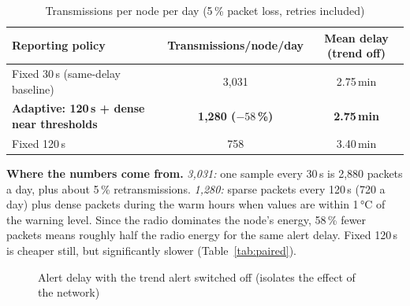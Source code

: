 \documentclass[11pt,a4paper]{report}
\newcommand{\why}[1]{\par\noindent\colorbox{gray!10}{\parbox{\dimexpr\linewidth-2\fboxsep}{\small\textbf{Where the numbers come from.} #1}}\par}
\begin{document}
\begin{table}[htbp]
\centering
\caption{Transmissions per node per day (5\,\% packet loss, retries included)}\label{tab:tx}
\small
\begin{tabular}{l c c}
\toprule
\textbf{Reporting policy} & \textbf{Transmissions/node/day} & \textbf{Mean delay (trend off)}\\
\midrule
Fixed 30\,s (same-delay baseline) & 3{,}031 & 2.75\,min\\
\textbf{Adaptive: 120\,s + dense near thresholds} & \textbf{1{,}280 ($-58$\,\%)} & \textbf{2.75\,min}\\
Fixed 120\,s & 758 & 3.40\,min\\
\bottomrule
\end{tabular}
\end{table}

\why{\emph{3{,}031:} one sample every 30\,s is 2{,}880 packets a day, plus about 5\,\% retransmissions. \emph{1{,}280:} sparse packets every 120\,s (720 a day) plus dense packets during the warm hours when values are within 1\,°C of the warning level. Since the radio dominates the node's energy, 58\,\% fewer packets means roughly half the radio energy for the same alert delay. Fixed 120\,s is cheaper still, but significantly slower (Table~\ref{tab:paired}).}

\begin{figure}[htbp]
\centering
{}
\caption{Alert delay with the trend alert switched off (isolates the effect of the network)}\label{fig:delay}
\end{figure}
\end{document}
